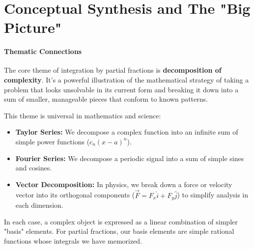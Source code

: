 \documentclass{article}
\begin{document}
\part{Conceptual Synthesis and The "Big Picture"}
\subsection{Thematic Connections}
The core theme of integration by partial fractions is \textbf{decomposition of complexity}. It's a powerful illustration of the mathematical strategy of taking a problem that looks unsolvable in its current form and breaking it down into a sum of smaller, manageable pieces that conform to known patterns.

This theme is universal in mathematics and science:
\begin{itemize}
    \item \textbf{Taylor Series:} We decompose a complex function into an infinite sum of simple power functions ($c_n(x-a)^n$).
    \item \textbf{Fourier Series:} We decompose a periodic signal into a sum of simple sines and cosines.
    \item \textbf{Vector Decomposition:} In physics, we break down a force or velocity vector into its orthogonal components ($\vec{F} = F_x\hat{i} + F_y\hat{j}$) to simplify analysis in each dimension.
\end{itemize}
In each case, a complex object is expressed as a linear combination of simpler "basis" elements. For partial fractions, our basis elements are simple rational functions whose integrals we have memorized.
\end{document}

